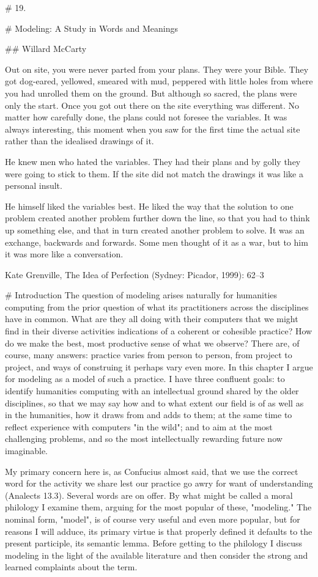 # 19.

#  Modeling: A Study in Words and Meanings

## Willard McCarty

Out on site, you were never parted from your plans. They were your Bible. They got dog-eared, yellowed, smeared with mud, peppered with little holes from where you had unrolled them on the ground. But although so sacred, the plans were only the start. Once you got out there on the site everything was different. No matter how carefully done, the plans could not foresee the variables. It was always interesting, this moment when you saw for the first time the actual site rather than the idealised drawings of it.

He knew men who hated the variables. They had their plans and by golly they were going to stick to them. If the site did not match the drawings it was like a personal insult.

He himself liked the variables best. He liked the way that the solution to one problem created another problem further down the line, so that you had to think up something else, and that in turn created another problem to solve. It was an exchange, backwards and forwards. Some men thought of it as a war, but to him it was more like a conversation.

Kate Grenville, The Idea of Perfection (Sydney: Picador, 1999): 62–3

# Introduction
The question of modeling arises naturally for humanities computing from the prior question of what its practitioners across the disciplines have in common. What are they all doing with their computers that we might find in their diverse activities indications of a coherent or cohesible practice? How do we make the best, most productive sense of what we observe? There are, of course, many answers: practice varies from person to person, from project to project, and ways of construing it perhaps vary even more. In this chapter I argue for modeling as a model of such a practice. I have three confluent goals: to identify humanities computing with an intellectual ground shared by the older disciplines, so that we may say how and to what extent our field is of as well as in the humanities, how it draws from and adds to them; at the same time to reflect experience with computers "in the wild"; and to aim at the most challenging problems, and so the most intellectually rewarding future now imaginable.

My primary concern here is, as Confucius almost said, that we use the correct word for the activity we share lest our practice go awry for want of understanding (Analects 13.3). Several words are on offer. By what might be called a moral philology I examine them, arguing for the most popular of these, "modeling." The nominal form, "model", is of course very useful and even more popular, but for reasons I will adduce, its primary virtue is that properly defined it defaults to the present participle, its semantic lemma. Before getting to the philology I discuss modeling in the light of the available literature and then consider the strong and learned complaints about the term.

